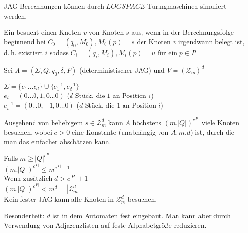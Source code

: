 \begin{satz}

    JAG-Berechnungen können durch $LOGSPACE$-Turingmaschinen simuliert werden.

\end{satz}



\begin{definition}

    Ein  besucht einen Knoten $v$ von Knoten $s$ aus, wenn in der Berechnungsfolge beginnend bei $C_0 = (q_0, M_0), M_0(p) = s$ der Knoten $v$ irgendwann belegt ist, d.\,h. existiert $i$ sodass $C_i = (q_i, M_i), M_i(p) = u$ für ein $p \in P$

\end{definition}

\begin{satz}


    Sei $A = (\Sigma, Q, q_0, \delta, P)$ (deterministischer JAG)
    und $V = (\mathcal{Z}_m)^d$

    $\Sigma = \{ e_1 \dots e_d \} \cup \{ e_1^{-1}, e_d^{-1} \}$
    \\
    $e_i = (0 \dots 0, 1, 0 \dots 0)$ ($d$ Stück, die $1$ an Position $i$)
    \\
    $e_i^{-1} = (0 \dots 0, -1, 0 \dots 0)$ ($d$ Stück, die $1$ an Position $i$)

    Ausgehend von beliebigem $s \in \mathcal{Z}_m^d$ kann $A$ höchstens $(m  . |Q|)^{c^{|P|}}$ viele Knoten besuchen, wobei $c > 0$ eine Konstante (unabhängig von $A, m.d$) ist, durch die man das einfacher abschätzen kann.

\end{satz}

Falls $m \geq |Q|^{c^P}$
\\
$(m  . |Q|)^{c^{|P|}} \leq m^{c^{|P|}+1}$
\\
Wenn zusätzlich $d > c^{|P|} + 1$
\\
$(m  . |Q|)^{c^{|P|}} < m^d = |\mathcal{Z}_m^d|$
\\
Kein fester JAG kann alle Knoten in $\mathcal{Z}_m^d$ besuchen.

Besonderheit: $d$ ist in dem Automaten fest eingebaut. Man kann aber durch Verwendung von Adjazenzlisten auf feste Alphabetgröße reduzieren.



